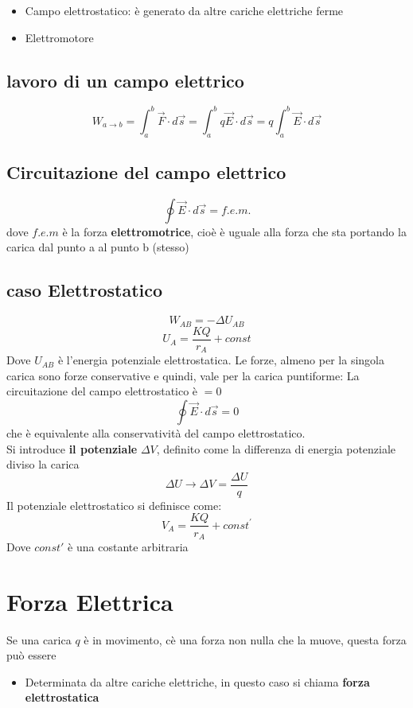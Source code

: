 \documentclass[a4paper]{report}
\begin{document}
  \begin{itemize}
    \item Campo elettrostatico: è generato da altre cariche elettriche ferme
    \item Elettromotore
  \end{itemize}

  \subsection{lavoro di un campo elettrico}
  $$ W_{a \rightarrow b} = \int_a^b \vec{F}\cdot d\vec{s} = \int_a^b q \vec{E} \cdot d\vec{s} = q \int_a^b \vec{E}\cdot d\vec{s} $$

  \subsection{Circuitazione del campo elettrico}
  $$\oint \vec{E} \cdot d\vec{s} = f.e.m.$$
  dove $f.e.m$ è la forza \textbf{elettromotrice}, cioè è uguale alla forza che sta portando la carica dal punto a al punto b (stesso)

  \subsection{caso Elettrostatico}
  $$ W_{AB} = - \Delta U_{AB}$$
  $$ U_{A} = \frac{KQ}{r_A} + const $$
  Dove $U_{AB}$ è l'energia potenziale elettrostatica. Le forze, almeno per la singola carica sono forze conservative e quindi, vale per la carica puntiforme: La circuitazione del campo elettrostatico è $=0$
  $$ \oint \vec{E} \cdot d\vec{s} = 0 $$
  che è equivalente alla conservatività del campo elettrostatico.\\
  Si introduce \textbf{il potenziale} $\Delta V$, definito come la differenza di energia potenziale diviso la carica
  $$ \Delta U \longrightarrow \Delta V = \frac{\Delta U}{q} $$
  Il potenziale elettrostatico si definisce come:
  $$ V_A = \frac{KQ}{r_A} + const^{'}$$
  Dove $const'$ è una costante arbitraria

  \section{Forza Elettrica}
  Se una carica $q$ è in movimento, cè una forza non nulla che la muove, questa forza può essere
  \begin{itemize}
    \item Determinata da altre cariche elettriche, in questo caso si chiama \textbf{forza elettrostatica}
  \end{itemize}
\end{document}
